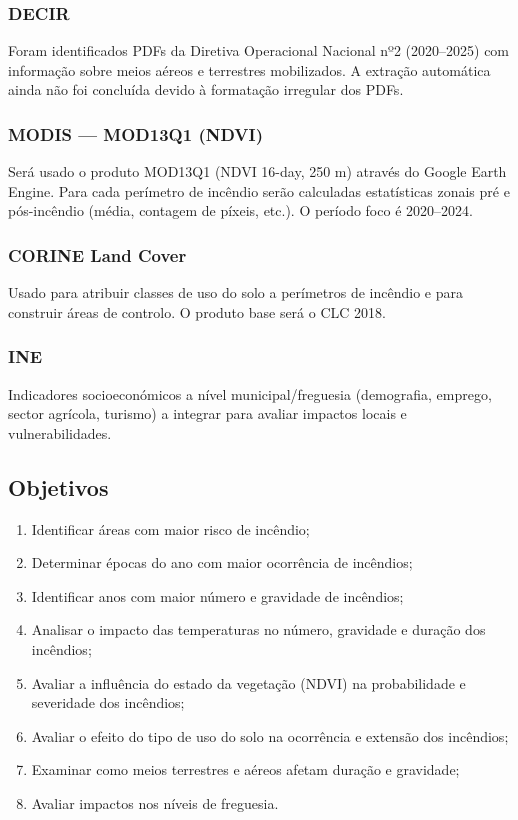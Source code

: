 \subsubsection{DECIR}
Foram identificados PDFs da Diretiva Operacional Nacional nº2 (2020–2025) com informação sobre meios aéreos e terrestres mobilizados. A extração automática ainda não foi concluída devido à formatação irregular dos PDFs.

\subsubsection{MODIS — MOD13Q1 (NDVI)}
Será usado o produto MOD13Q1 (NDVI 16-day, 250 m) através do Google Earth Engine. Para cada perímetro de incêndio serão calculadas estatísticas zonais pré e pós-incêndio (média, contagem de píxeis, etc.). O período foco é 2020–2024.

\subsubsection{CORINE Land Cover}
Usado para atribuir classes de uso do solo a perímetros de incêndio e para construir áreas de controlo. O produto base será o CLC 2018.

\subsubsection{INE}
Indicadores socioeconómicos a nível municipal/freguesia (demografia, emprego, sector agrícola, turismo) a integrar para avaliar impactos locais e vulnerabilidades.

\subsection{Objetivos}
\begin{enumerate}
	\item Identificar áreas com maior risco de incêndio;
	\item Determinar épocas do ano com maior ocorrência de incêndios;
	\item Identificar anos com maior número e gravidade de incêndios;
	\item Analisar o impacto das temperaturas no número, gravidade e duração dos incêndios;
	\item Avaliar a influência do estado da vegetação (NDVI) na probabilidade e severidade dos incêndios;
	\item Avaliar o efeito do tipo de uso do solo na ocorrência e extensão dos incêndios;
	\item Examinar como meios terrestres e aéreos afetam duração e gravidade;
	\item Avaliar impactos nos níveis de freguesia.
\end{enumerate}

